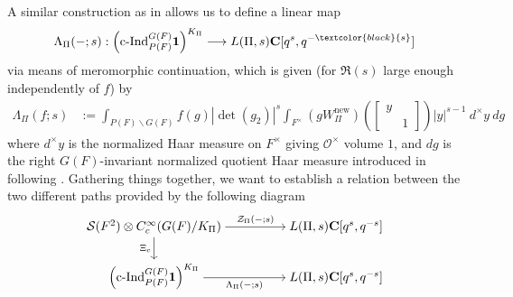 \documentclass{amsart}
\theoremstyle{plain}
\theoremstyle{plain}
\theoremstyle{remark}
\begin{document}
A similar construction as in \cite[\S $4$]{groutides2024rankinselbergintegralstructureseuler} allows us to define a linear map 
$$\Lambda_\Pi(-;s): \left(\mathrm{c}\text{-}\mathrm{Ind}_{P(F)}^{G(F)}\mathbf{1}\right)^{K_\Pi}\longrightarrow L(\Pi,s)\mathbf{C}[q^s,q^{-\textcolor{black}{s}}]$$
via means of meromorphic continuation,
which is given (for $\Re(s)$ large enough independently of $f$) by
\begin{align*}
\Lambda_\Pi(f;s)
    &:=\int_{P(F)\backslash G(F)} f(g)|\det(g_2)|^s\int_{F^\times} (gW_\Pi^\mathrm{new})(\left[\begin{smallmatrix}
        y & \\
        & 1
    \end{smallmatrix}\right])|y|^{s-1}\ d^\times y\ dg
\end{align*}
where $d^\times y$ is the normalized Haar measure on $F^\times$ giving $\mathcal{O}^\times$ volume $1$, and $dg$ is the right $G(F)$-invariant normalized quotient Haar measure introduced in \cite[\S $4.1$]{groutides2024rankinselbergintegralstructureseuler} following \cite[\S $2.2$]{kurinczuk2017rankin}.
 Gathering things together, we want to establish a relation between the two different paths provided by the following diagram
\[\begin{tikzcd}[ampersand replacement=\&,cramped]
	{\mathcal{S}(F^2)\otimes C_c^\infty(G(F)/K_\Pi)} \&\& {L(\Pi,s)\mathbf{C}[q^s,q^{-s}]} \\
	{\left(\mathrm{c}\text{-}\mathrm{Ind}_{P(F)}^{G(F)}\mathbf{1}\right)^{K_\Pi}} \&\& {L(\Pi,s)\mathbf{C}[q^s,q^{-s}]}
	\arrow["{{\mathcal{Z}_\Pi(-;s)}}", from=1-1, to=1-3]
	\arrow["{{\Xi_c}}"', from=1-1, to=2-1]
	\arrow["{{\Lambda_\Pi(-;s)}}"', from=2-1, to=2-3]
\end{tikzcd}\]
\end{document}

